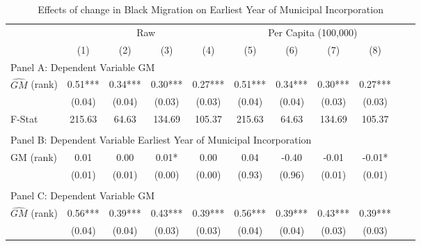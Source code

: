  \begin{table}[htbp]\centering {} \begin{threeparttable} \caption{Effects of change in Black Migration on Earliest Year of Municipal Incorporation} \begin{tabular}{l*{10}{c}} \toprule
                &\multicolumn{4}{c}{Raw}                                    &\multicolumn{4}{c}{Per Capita (100,000)}                   \\\cmidrule(lr){2-5}\cmidrule(lr){6-9}
                &\multicolumn{1}{c}{(1)}   &\multicolumn{1}{c}{(2)}   &\multicolumn{1}{c}{(3)}   &\multicolumn{1}{c}{(4)}   &\multicolumn{1}{c}{(5)}   &\multicolumn{1}{c}{(6)}   &\multicolumn{1}{c}{(7)}   &\multicolumn{1}{c}{(8)}   \\
\cmidrule(lr){1-9}
\multicolumn{8}{l}{Panel A: Dependent Variable GM}\\
\cmidrule(lr){1-9}
$\hat{GM}$ (rank)&       0.51***&       0.34***&       0.30***&       0.27***&       0.51***&       0.34***&       0.30***&       0.27***\\
                &     (0.04)   &     (0.04)   &     (0.03)   &     (0.03)   &     (0.04)   &     (0.04)   &     (0.03)   &     (0.03)   \\
\midrule
F-Stat          &     215.63   &      64.63   &     134.69   &     105.37   &     215.63   &      64.63   &     134.69   &     105.37   \\
\cmidrule[\heavyrulewidth](lr){1-9} \\ \cmidrule[\heavyrulewidth](lr){1-9}
\multicolumn{8}{l}{Panel B: Dependent Variable Earliest Year of Municipal Incorporation}\\
\cmidrule(lr){1-9}
GM  (rank)      &       0.01   &       0.00   &       0.01*  &       0.00   &       0.04   &      -0.40   &      -0.01   &      -0.01*  \\
                &     (0.01)   &     (0.01)   &     (0.00)   &     (0.00)   &     (0.93)   &     (0.96)   &     (0.01)   &     (0.01)   \\
\cmidrule[\heavyrulewidth](lr){1-9} \\ \cmidrule[\heavyrulewidth](lr){1-9}
\multicolumn{8}{l}{Panel C: Dependent Variable GM}\\
\cmidrule(lr){1-9}
$\hat{GM}$ (rank)&       0.56***&       0.39***&       0.43***&       0.39***&       0.56***&       0.39***&       0.43***&       0.39***\\
                &     (0.04)   &     (0.04)   &     (0.03)   &     (0.03)   &     (0.04)   &     (0.04)   &     (0.03)   &     (0.03)   \\

\end{tabular}
\end{threeparttable}
\end{table}
